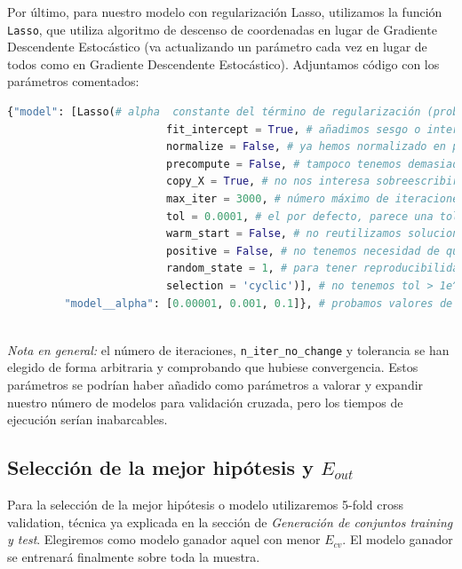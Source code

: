 \documentclass[11pt,a4paper]{article}
\theoremstyle{definition}
\begin{document}
	Por último, para nuestro modelo con regularización Lasso, utilizamos la función \texttt{Lasso}, que utiliza algoritmo de descenso de coordenadas en lugar de Gradiente Descendente Estocástico (va actualizando un parámetro cada vez en lugar de todos como en Gradiente Descendente Estocástico). Adjuntamos código con los parámetros comentados:
	\begin{lstlisting}[language=Python, caption= Par\'ametros usados en \texttt{Lasso}, inputencoding=latin1]
  {"model": [Lasso(# alpha  constante del término de regularización (probaremos distintos valores mediante 5-fold cross validation)
                         fit_intercept = True, # añadimos sesgo o intercept pues nuestra matriz aún no tiene columna de 1s
                         normalize = False, # ya hemos normalizado en preprocesado
                         precompute = False, # tampoco tenemos demasiados datos
                         copy_X = True, # no nos interesa sobreescribir X
                         max_iter = 3000, # número máximo de iteraciones arbitrario
                         tol = 0.0001, # el por defecto, parece una tolerancia razonable. Elección arbitraria
                         warm_start = False, # no reutilizamos soluciones anteriores como inicio
                         positive = False, # no tenemos necesidad de que los coef. sean positivos
                         random_state = 1, # para tener reproducibilidad de los resultados
                         selection = 'cyclic')], # no tenemos tol > 1e^-4 para que pueda resultar interesante 'random'
         "model__alpha": [0.00001, 0.001, 0.1]}, # probamos valores de regularización arbitrarios dentro de los recomendados 

	\end{lstlisting} ~\\
	
	\textit{Nota en general:} el número de iteraciones, \texttt{n\_iter\_no\_change} y tolerancia se han elegido de forma arbitraria y comprobando que hubiese convergencia. Estos parámetros se podrían haber añadido como parámetros a valorar y expandir nuestro número de modelos para validación cruzada, pero los tiempos de ejecución serían inabarcables.
	
	\subsection{Selección de la mejor hipótesis y $E_{out}$}
	Para la selección de la mejor hipótesis o modelo utilizaremos 5-fold cross validation, técnica ya explicada en la sección de \textit{Generación de conjuntos training y test}. Elegiremos como modelo ganador aquel con menor $E_{cv}$. El modelo ganador se entrenará finalmente sobre toda la muestra.
	
\end{document}
